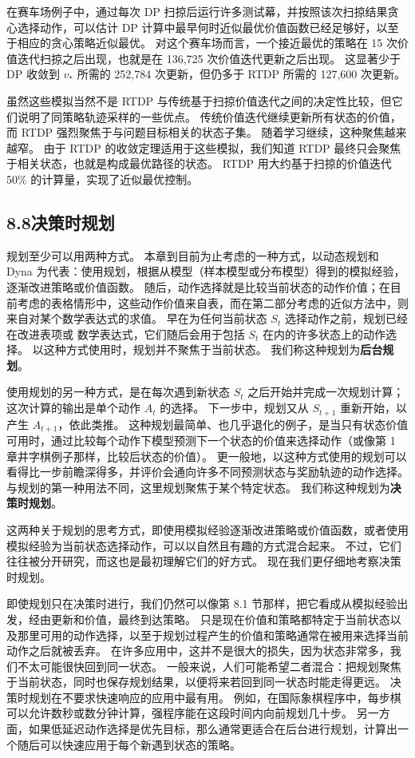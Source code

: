 \documentclass[UTF8, 12pt, fontset=fandol, oneside]{ctexart}
\begin{document}
在赛车场例子中，通过每次 DP 扫掠后运行许多测试幕，并按照该次扫掠结果贪心选择动作，可以估计 DP 计算中最早何时近似最优价值函数已经足够好，以至于相应的贪心策略近似最优。
对这个赛车场而言，一个接近最优的策略在 15 次价值迭代扫掠之后出现，也就是在 136,725 次价值迭代更新之后出现。
这显著少于 DP 收敛到 $v_*$ 所需的 252,784 次更新，但仍多于 RTDP 所需的 127,600 次更新。

虽然这些模拟当然不是 RTDP 与传统基于扫掠价值迭代之间的决定性比较，但它们说明了同策略轨迹采样的一些优点。
传统价值迭代继续更新所有状态的价值，而 RTDP 强烈聚焦于与问题目标相关的状态子集。
随着学习继续，这种聚焦越来越窄。
由于 RTDP 的收敛定理适用于这些模拟，我们知道 RTDP 最终只会聚焦于相关状态，也就是构成最优路径的状态。
RTDP 用大约基于扫掠的价值迭代 50\% 的计算量，实现了近似最优控制。

\subsection*{8.8\quad 决策时规划}

规划至少可以用两种方式。
本章到目前为止考虑的一种方式，以动态规划和 Dyna 为代表：使用规划，根据从模型（样本模型或分布模型）得到的模拟经验，逐渐改进策略或价值函数。
随后，动作选择就是比较当前状态的动作价值；在目前考虑的表格情形中，这些动作价值来自表，而在第二部分考虑的近似方法中，则来自对某个数学表达式的求值。
早在为任何当前状态 $S_t$ 选择动作之前，规划已经在改进表项或
数学表达式，它们随后会用于包括 $S_t$ 在内的许多状态上的动作选择。
以这种方式使用时，规划并不聚焦于当前状态。
我们称这种规划为\textbf{后台规划}。

使用规划的另一种方式，是在每次遇到新状态 $S_t$ 之后开始并完成一次规划计算；这次计算的输出是单个动作 $A_t$ 的选择。
下一步中，规划又从 $S_{t+1}$ 重新开始，以产生 $A_{t+1}$，依此类推。
这种规划最简单、也几乎退化的例子，是当只有状态价值可用时，通过比较每个动作下模型预测下一个状态的价值来选择动作（或像第 1 章井字棋例子那样，比较后状态的价值）。
更一般地，以这种方式使用的规划可以看得比一步前瞻深得多，并评价会通向许多不同预测状态与奖励轨迹的动作选择。
与规划的第一种用法不同，这里规划聚焦于某个特定状态。
我们称这种规划为\textbf{决策时规划}。

这两种关于规划的思考方式，即使用模拟经验逐渐改进策略或价值函数，或者使用模拟经验为当前状态选择动作，可以以自然且有趣的方式混合起来。
不过，它们往往被分开研究，而这也是最初理解它们的好方式。
现在我们更仔细地考察决策时规划。

即使规划只在决策时进行，我们仍然可以像第 8.1 节那样，把它看成从模拟经验出发，经由更新和价值，最终到达策略。
只是现在价值和策略都特定于当前状态以及那里可用的动作选择，以至于规划过程产生的价值和策略通常在被用来选择当前动作之后就被丢弃。
在许多应用中，这并不是很大的损失，因为状态非常多，我们不太可能很快回到同一状态。
一般来说，人们可能希望二者混合：把规划聚焦于当前状态，同时也保存规划结果，以便将来若回到同一状态时能走得更远。
决策时规划在不要求快速响应的应用中最有用。
例如，在国际象棋程序中，每步棋可以允许数秒或数分钟计算，强程序能在这段时间内向前规划几十步。
另一方面，如果低延迟动作选择是优先目标，那么通常更适合在后台进行规划，计算出一个随后可以快速应用于每个新遇到状态的策略。
\end{document}
